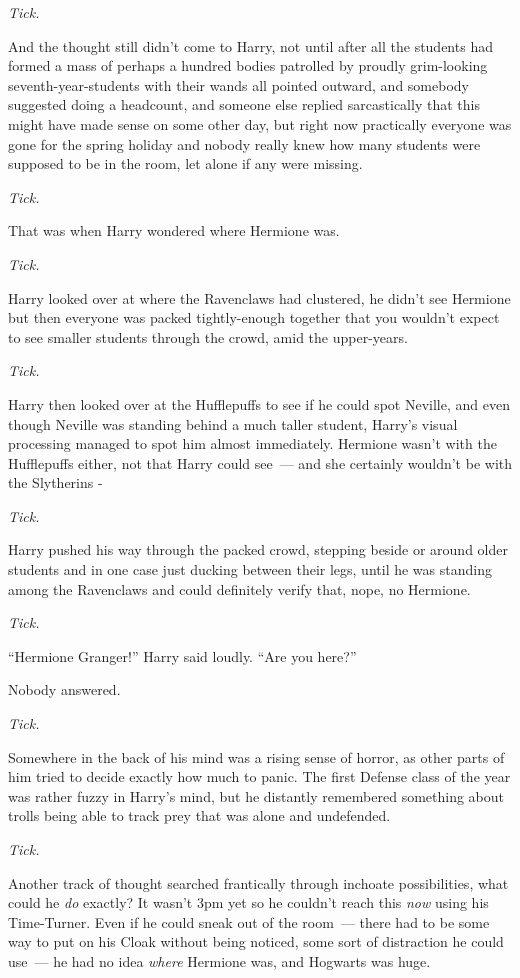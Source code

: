 \emph{Tick.}

And the thought still didn't come to Harry, not until after all the students had formed a mass of perhaps a hundred bodies patrolled by proudly grim-looking seventh-year-students with their wands all pointed outward, and somebody suggested doing a headcount, and someone else replied sarcastically that this might have made sense on some other day, but right now practically everyone was gone for the spring holiday and nobody really knew how many students were supposed to be in the room, let alone if any were missing.

\emph{Tick.}

That was when Harry wondered where Hermione was.

\emph{Tick.}

Harry looked over at where the Ravenclaws had clustered, he didn't see Hermione but then everyone was packed tightly-enough together that you wouldn't expect to see smaller students through the crowd, amid the upper-years.

\emph{Tick.}

Harry then looked over at the Hufflepuffs to see if he could spot Neville, and even though Neville was standing behind a much taller student, Harry's visual processing managed to spot him almost immediately. Hermione wasn't with the Hufflepuffs either, not that Harry could see~--- and she certainly wouldn't be with the Slytherins -

\emph{Tick.}

Harry pushed his way through the packed crowd, stepping beside or around older students and in one case just ducking between their legs, until he was standing among the Ravenclaws and could definitely verify that, nope, no Hermione.

\emph{Tick.}

``Hermione Granger!'' Harry said loudly. ``Are you here?''

Nobody answered.

\emph{Tick.}

Somewhere in the back of his mind was a rising sense of horror, as other parts of him tried to decide exactly how much to panic. The first Defense class of the year was rather fuzzy in Harry's mind, but he distantly remembered something about trolls being able to track prey that was alone and undefended.

\emph{Tick.}

Another track of thought searched frantically through inchoate possibilities, what could he \emph{do} exactly? It wasn't 3pm yet so he couldn't reach this \emph{now} using his Time-Turner. Even if he could sneak out of the room~--- there had to be some way to put on his Cloak without being noticed, some sort of distraction he could use~--- he had no idea \emph{where} Hermione was, and Hogwarts was huge.

